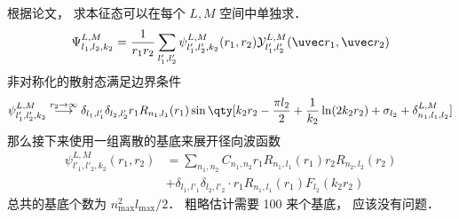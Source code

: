 
根据论文， 求本征态可以在每个 $L,M$ 空间中单独求．
\begin{equation}
\Psi_{l_1,l_2,k_2}^{L,M} = \frac{1}{r_1 r_2}\sum_{l'_1, l'_2}  \psi_{l'_1, l'_2, k_2}^{L, M}(r_1, r_2)\mathcal{Y}_{l'_1, l'_2}^{L, M}(\uvec r_1, \uvec r_2)
\end{equation}
非对称化的散射态满足边界条件
\begin{equation}
\psi_{l'_1,l'_2,k_2}^{L, M} \overset{r_2\to\infty}{\longrightarrow} \delta_{l_1,l'_1}\delta_{l_2,l'_2} r_1 R_{n_1,l_1}(r_1)
\sin\qty[k_2 r_2 - \frac{\pi l_2}{2} +\frac{1}{k_2}\ln(2k_2 r_2) + \sigma_{l_2} + \delta_{n_1,l_1,l_2}^{L,M}]
\end{equation}
那么接下来使用一组离散的基底来展开径向波函数
\begin{equation}
\begin{aligned}
\psi_{l'_1, l'_2,k_2}^{L, M}(r_1, r_2) &= \sum_{n_1,n_2} C_{n_1,n_2} r_1 R_{n_1,l_1}(r_1) r_2R_{n_2,l_2}(r_2)\\
& +\delta_{l_1,l'_1}\delta_{l_2,l'_2} \cdot r_1 R_{n_1,l_1}(r_1) F_{l_2}(k_2 r_2)
\end{aligned}
\end{equation}
总共的基底个数为 $n_\text{max}^2 l_\text{max}/2$． 粗略估计需要 100 来个基底， 应该没有问题．

